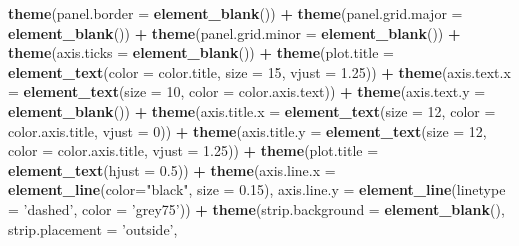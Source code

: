 \documentclass[]{article}
\newenvironment{Shaded}{\begin{snugshade}}{\end{snugshade}}
\newcommand{\KeywordTok}[1]{\textcolor[rgb]{0.13,0.29,0.53}{\textbf{#1}}}
\newcommand{\DataTypeTok}[1]{\textcolor[rgb]{0.13,0.29,0.53}{#1}}
\newcommand{\DecValTok}[1]{\textcolor[rgb]{0.00,0.00,0.81}{#1}}
\newcommand{\FloatTok}[1]{\textcolor[rgb]{0.00,0.00,0.81}{#1}}
\newcommand{\StringTok}[1]{\textcolor[rgb]{0.31,0.60,0.02}{#1}}
\newcommand{\OperatorTok}[1]{\textcolor[rgb]{0.81,0.36,0.00}{\textbf{#1}}}
\newcommand{\NormalTok}[1]{#1}
\begin{document}
\begin{Shaded}
\begin{Highlighting}[]
\StringTok{    }\KeywordTok{theme}\NormalTok{(}\DataTypeTok{panel.border =} \KeywordTok{element_blank}\NormalTok{()) }\OperatorTok{+}
\StringTok{    }\KeywordTok{theme}\NormalTok{(}\DataTypeTok{panel.grid.major =} \KeywordTok{element_blank}\NormalTok{()) }\OperatorTok{+}\StringTok{ }
\StringTok{    }\KeywordTok{theme}\NormalTok{(}\DataTypeTok{panel.grid.minor =} \KeywordTok{element_blank}\NormalTok{()) }\OperatorTok{+}\StringTok{ }
\StringTok{    }\KeywordTok{theme}\NormalTok{(}\DataTypeTok{axis.ticks =} \KeywordTok{element_blank}\NormalTok{()) }\OperatorTok{+}
\StringTok{    }\KeywordTok{theme}\NormalTok{(}\DataTypeTok{plot.title =} \KeywordTok{element_text}\NormalTok{(}\DataTypeTok{color =}\NormalTok{ color.title, }\DataTypeTok{size =} \DecValTok{15}\NormalTok{, }\DataTypeTok{vjust =} \FloatTok{1.25}\NormalTok{)) }\OperatorTok{+}
\StringTok{    }\KeywordTok{theme}\NormalTok{(}\DataTypeTok{axis.text.x =} \KeywordTok{element_text}\NormalTok{(}\DataTypeTok{size =} \DecValTok{10}\NormalTok{, }\DataTypeTok{color =}\NormalTok{ color.axis.text)) }\OperatorTok{+}\StringTok{ }
\StringTok{    }\KeywordTok{theme}\NormalTok{(}\DataTypeTok{axis.text.y =} \KeywordTok{element_blank}\NormalTok{()) }\OperatorTok{+}\StringTok{ }
\StringTok{    }\KeywordTok{theme}\NormalTok{(}\DataTypeTok{axis.title.x =} \KeywordTok{element_text}\NormalTok{(}\DataTypeTok{size =} \DecValTok{12}\NormalTok{, }\DataTypeTok{color =}\NormalTok{ color.axis.title, }\DataTypeTok{vjust =} \DecValTok{0}\NormalTok{)) }\OperatorTok{+}
\StringTok{    }\KeywordTok{theme}\NormalTok{(}\DataTypeTok{axis.title.y =} \KeywordTok{element_text}\NormalTok{(}\DataTypeTok{size =} \DecValTok{12}\NormalTok{, }\DataTypeTok{color =}\NormalTok{ color.axis.title, }\DataTypeTok{vjust =} \FloatTok{1.25}\NormalTok{)) }\OperatorTok{+}
\StringTok{    }\KeywordTok{theme}\NormalTok{(}\DataTypeTok{plot.title =} \KeywordTok{element_text}\NormalTok{(}\DataTypeTok{hjust =} \FloatTok{0.5}\NormalTok{)) }\OperatorTok{+}
\StringTok{    }\KeywordTok{theme}\NormalTok{(}\DataTypeTok{axis.line.x =} \KeywordTok{element_line}\NormalTok{(}\DataTypeTok{color=}\StringTok{"black"}\NormalTok{, }\DataTypeTok{size =} \FloatTok{0.15}\NormalTok{),}
          \DataTypeTok{axis.line.y =} \KeywordTok{element_line}\NormalTok{(}\DataTypeTok{linetype =} \StringTok{'dashed'}\NormalTok{, }\DataTypeTok{color =} \StringTok{'grey75'}\NormalTok{)) }\OperatorTok{+}
\StringTok{    }\KeywordTok{theme}\NormalTok{(}\DataTypeTok{strip.background =} \KeywordTok{element_blank}\NormalTok{(),}
          \DataTypeTok{strip.placement =} \StringTok{'outside'}\NormalTok{,}

\end{Highlighting}
\end{Shaded}
\end{document}
